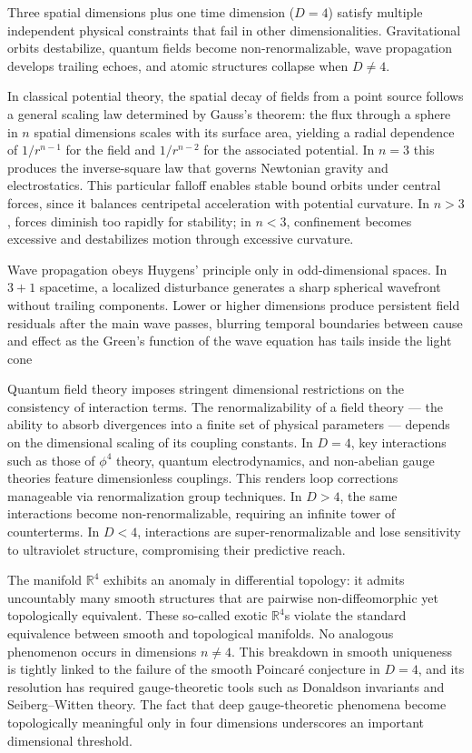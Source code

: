 Three spatial dimensions plus one time dimension ($D=4$) satisfy multiple independent physical constraints that fail in other dimensionalities. Gravitational orbits destabilize, quantum fields become non-renormalizable, wave propagation develops trailing echoes, and atomic structures collapse when $D \ne 4$.

In classical potential theory, the spatial decay of fields from a point source follows a general scaling law determined by Gauss’s theorem: the flux through a sphere in $n$ spatial dimensions scales with its surface area, yielding a radial dependence of $1/r^{n-1}$ for the field and $1/r^{n-2}$ for the associated potential. In $n=3$ this produces the inverse-square law that governs Newtonian gravity and electrostatics. This particular falloff enables stable bound orbits under central forces, since it balances centripetal acceleration with potential curvature. In $n>3$, forces diminish too rapidly for stability; in $n<3$, confinement becomes excessive and destabilizes motion through excessive curvature.

Wave propagation obeys Huygens' principle only in odd-dimensional spaces. In $3+1$ spacetime, a localized disturbance generates a sharp spherical wavefront without trailing components. Lower or higher dimensions produce persistent field residuals after the main wave passes, blurring temporal boundaries between cause and effect as the Green’s function of the wave equation has tails inside the light cone

Quantum field theory imposes stringent dimensional restrictions on the consistency of interaction terms. The renormalizability of a field theory — the ability to absorb divergences into a finite set of physical parameters — depends on the dimensional scaling of its coupling constants. In $D=4$, key interactions such as those of $\phi^4$ theory, quantum electrodynamics, and non-abelian gauge theories feature dimensionless couplings. This renders loop corrections manageable via renormalization group techniques. In $D>4$, the same interactions become non-renormalizable, requiring an infinite tower of counterterms. In $D<4$, interactions are super-renormalizable and lose sensitivity to ultraviolet structure, compromising their predictive reach.

The manifold $\mathbb{R}^4$ exhibits an anomaly in differential topology: it admits uncountably many smooth structures that are pairwise non-diffeomorphic yet topologically equivalent. These so-called exotic $\mathbb{R}^4$s violate the standard equivalence between smooth and topological manifolds. No analogous phenomenon occurs in dimensions $n \ne 4$. This breakdown in smooth uniqueness is tightly linked to the failure of the smooth Poincaré conjecture in $D=4$, and its resolution has required gauge-theoretic tools such as Donaldson invariants and Seiberg–Witten theory. The fact that deep gauge-theoretic phenomena become topologically meaningful only in four dimensions underscores an important dimensional threshold.

